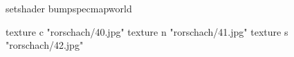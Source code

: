 setshader bumpspecmapworld

    texture c "rorschach/40.jpg"
    texture n "rorschach/41.jpg"
    texture s "rorschach/42.jpg"

